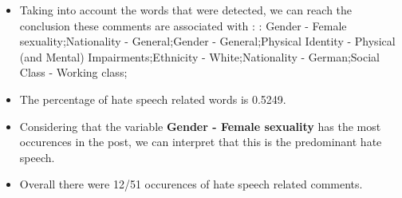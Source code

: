\documentclass[11pt]{article}
\begin{document}
\begin{itemize}\item Taking into account the words that were detected, we can reach the conclusion these comments are associated with : : Gender - Female sexuality;Nationality - General;Gender - General;Physical Identity - Physical (and Mental) Impairments;Ethnicity - White;Nationality - German;Social Class - Working class;%

\item The percentage of hate speech related words is 0.5249.

\item Considering that the variable \textbf{Gender - Female sexuality} has the most occurences in the post, we can interpret that this is the predominant hate speech.

\item Overall there were 12/51 occurences of hate speech related comments.\end{itemize}
\end{document}
